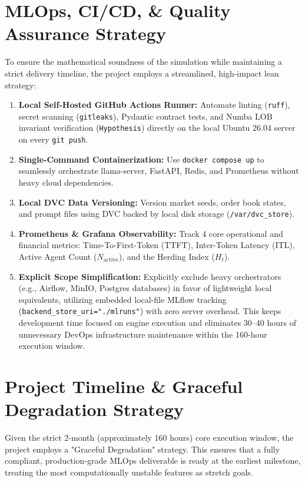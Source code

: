 \documentclass[10pt,a4paper]{article}
\begin{document}
\section{MLOps, CI/CD, \& Quality Assurance Strategy}

To ensure the mathematical soundness of the simulation while maintaining a strict delivery timeline, the project employs a streamlined, high-impact lean strategy:

\begin{enumerate}
    \item \textbf{Local Self-Hosted GitHub Actions Runner:} Automate linting (\texttt{ruff}), secret scanning (\texttt{gitleaks}), Pydantic contract tests, and Numba LOB invariant verification (\texttt{Hypothesis}) directly on the local Ubuntu 26.04 server on every \texttt{git push}.
    \item \textbf{Single-Command Containerization:} Use \texttt{docker compose up} to seamlessly orchestrate llama-server, FastAPI, Redis, and Prometheus without heavy cloud dependencies.
    \item \textbf{Local DVC Data Versioning:} Version market seeds, order book states, and prompt files using DVC backed by local disk storage (\texttt{/var/dvc\_store}).
    \item \textbf{Prometheus \& Grafana Observability:} Track 4 core operational and financial metrics: Time-To-First-Token (TTFT), Inter-Token Latency (ITL), Active Agent Count ($N_{\text{active}}$), and the Herding Index ($H_t$).
    \item \textbf{Explicit Scope Simplification:} Explicitly exclude heavy orchestrators (e.g., Airflow, MinIO, Postgres databases) in favor of lightweight local equivalents, utilizing embedded local-file MLflow tracking (\texttt{backend\_store\_uri="./mlruns"}) with zero server overhead. This keeps development time focused on engine execution and eliminates 30--40 hours of unnecessary DevOps infrastructure maintenance within the 160-hour execution window.
\end{enumerate}

\section{Project Timeline \& Graceful Degradation Strategy}

Given the strict 2-month (approximately 160 hours) core execution window, the project employs a "Graceful Degradation" strategy. This ensures that a fully compliant, production-grade MLOps deliverable is ready at the earliest milestone, treating the most computationally unstable features as stretch goals.
\end{document}
